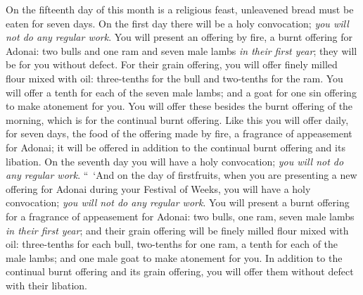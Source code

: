 \begin{biblechapter}
\verse On the fifteenth day of this month is a religious feast, unleavened bread must be eaten for seven days.
\verse On the first day there will be a holy convocation; \textit{you will not do any regular work}.
\verse You will present an offering by fire, a burnt offering for Adonai: two bulls and one ram and seven male lambs \textit{in their first year}; they will be for you without defect.
\verse For their grain offering, you will offer finely milled flour mixed with oil: three-tenths for the bull and two-tenths for the ram.
\verse You will offer a tenth for each of the seven male lambs;
\verse and a goat for one sin offering to make atonement for you.
\verse You will offer these besides the burnt offering of the morning, which is for the continual burnt offering.
\verse Like this you will offer daily, for seven days, the food of the offering made by fire, a fragrance of appeasement for Adonai; it will be offered in addition to the continual burnt offering and its libation.
\verse On the seventh day you will have a holy convocation; \textit{you will not do any regular work}.
 “ ‘And on the day of firstfruits, when you are presenting a new offering for Adonai during your Festival of Weeks, you will have a holy convocation; \textit{you will not do any regular work}.
\verse You will present a burnt offering for a fragrance of appeasement for Adonai: two bulls, one ram, seven male lambs \textit{in their first year};
\verse and their grain offering will be finely milled flour mixed with oil: three-tenths for each bull, two-tenths for one ram,
\verse a tenth for each of the male lambs;
\verse and one male goat to make atonement for you.
\verse In addition to the continual burnt offering and its grain offering, you will offer them without defect with their libation.
\end{biblechapter}

